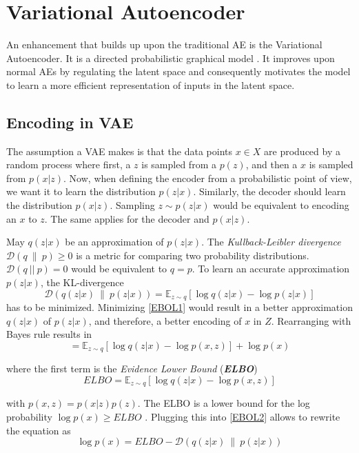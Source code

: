 \documentclass[a4paper]{IEEEtran}
\begin{document}
\section{Variational Autoencoder}
An enhancement that builds up upon the traditional AE is the Variational Autoencoder. It is a directed probabilistic graphical model \cite{kingma2014autoencoding}. It improves upon normal AEs by regulating the latent space and consequently motivates the model to learn a more efficient representation of inputs in the latent space.

\subsection{Encoding in VAE}
The assumption a VAE makes is that the data points $x \in X$ are produced by a random process where first, a $z$ is sampled from a $p(z)$, and then a $x$ is sampled from $p(x|z)$. Now, when defining the encoder from a probabilistic point of view, we want it to learn the distribution $p(z|x)$. Similarly, the decoder should learn the distribution $p(x|z)$. Sampling $z \sim p(z|x)$ would be equivalent to encoding an $x$ to $z$. The same applies for the decoder and $p(x|z)$.

May $q(z|x)$ be an approximation of $p(z|x)$. The 
\textit{Kullback-Leibler divergence} $\mathcal{D}(q \ \| \ p) \geq 0$ is a metric for comparing two probability distributions. $\mathcal{D}(q \ || \ p) = 0$ would be equivalent to $q = p$. To learn an accurate approximation $p(z|x)$, the KL-divergence
\begin{equation}
	\mathcal{D}\left(q(z|x) \ \| \ p(z|x) \right) = \mathbb{E}_{z \sim q}\left[ \log q(z|x) - \log p(z|x) \right]
	\label{EBOL1}
\end{equation}
has to be minimized. Minimizing \eqref{EBOL1} would result in a better approximation $q(z|x)$ of $p(z|x)$, and therefore, a better encoding of $x$ in $Z$. Rearranging with Bayes rule results in
\begin{equation}
	= \mathbb{E}_{z \sim q} \left[ \log q(z|x) - \log p(x,z) \right] + \log p(x)
	\label{EBOL2}
\end{equation}

where the first term is the \textit{Evidence Lower Bound} (\textit{\textbf{ELBO}})
\begin{equation}
	ELBO = \mathbb{E}_{z \sim q} \left[ \log q(z|x) - \log p(x,z) \right]
	\label{ELBO3}
\end{equation} 

with $p(x,z) = p(x|z)p(z)$. The ELBO is a lower bound for the log probability $\log p(x) \geq ELBO$ \cite{kingma_2019}. Plugging this into \eqref{EBOL2} allows to rewrite the equation as
\begin{equation}
	\log p(x) = ELBO - \mathcal{D}\left(q(z|x) \ \| \ p(z|x) \right)
	\label{ELBO4}
\end{equation}
\end{document}
